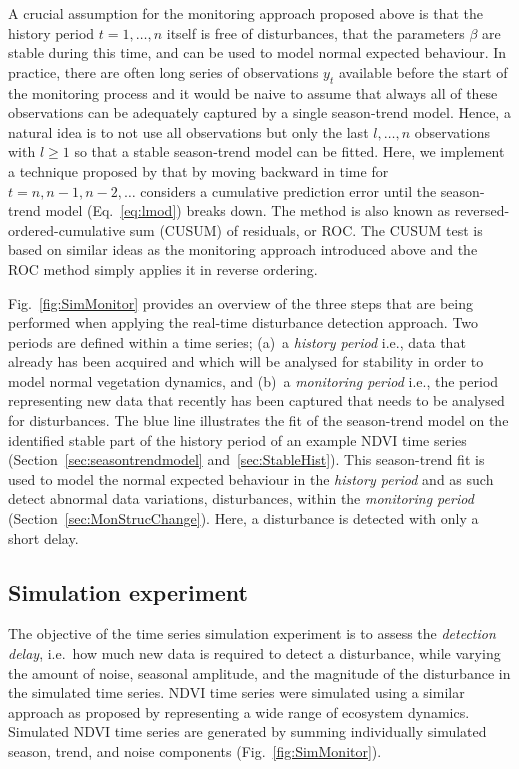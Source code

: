 \documentclass[authoryear,preprint,review,10pt]{elsarticle}
\begin{document}
A crucial assumption for the monitoring approach proposed above is that
the history period $t = 1, \dots, n$ itself is free of disturbances, that the parameters $\beta$ are stable during this time, and can be used to model normal expected behaviour. In practice, there are often long series of observations $y_t$ available
before the start of the monitoring process and it would be naive to assume
that always all of these observations can be adequately captured by a single
season-trend model. Hence, a natural idea is to not use all observations
but only the last $l, \dots, n$ observations with $l \ge 1$ so that a stable
season-trend model can be fitted. 
Here, we implement a technique proposed by \citet{Pesaran2002} that by moving backward in time for $t = n, n-1, n-2, \dots$ considers a cumulative prediction error until the season-trend model (Eq.~\ref{eq:lmod}) breaks down. The method is also known as reversed-ordered-cumulative sum (CUSUM) of residuals, or ROC.
The CUSUM test \citep[see][for more details]{Zeileis2002} is based on similar ideas as the monitoring approach introduced
above and the ROC method simply applies it in reverse ordering.

Fig.~\ref{fig:SimMonitor} provides an overview of the three steps that are being performed when applying the real-time disturbance detection approach. 
Two periods are defined within a time series; (a)~a \emph{history period} i.e., data that already has been acquired and which will be analysed for stability
in order to model normal vegetation dynamics, and (b)~a \emph{monitoring period} i.e., the period representing new data that recently has been captured that
needs to be analysed for disturbances. The blue line illustrates the fit of the season-trend model on the identified stable part of the history period of an
example NDVI time series (Section~\ref{sec:seasontrendmodel} and~\ref{sec:StableHist}). This season-trend fit is used to model the normal expected behaviour
in the \emph{history period} and as such detect abnormal data variations, disturbances, within the \emph{monitoring period}
(Section~\ref{sec:MonStrucChange}). Here, a disturbance is detected with only a short delay.

\subsection{Simulation experiment}\label{sec:Valsim}

The objective of the time series simulation experiment is to assess the \emph{detection delay}, i.e.\ how much new data is required to detect a disturbance,
while varying the amount of noise, seasonal amplitude, and the magnitude of the disturbance in the simulated time series. NDVI time series were simulated
using a similar approach as proposed by  \citet{Verbesselt:2010wo} representing a wide range of ecosystem dynamics. Simulated NDVI time series are generated by summing individually simulated season, trend, and noise components (Fig.~\ref{fig:SimMonitor}). 
\end{document}
